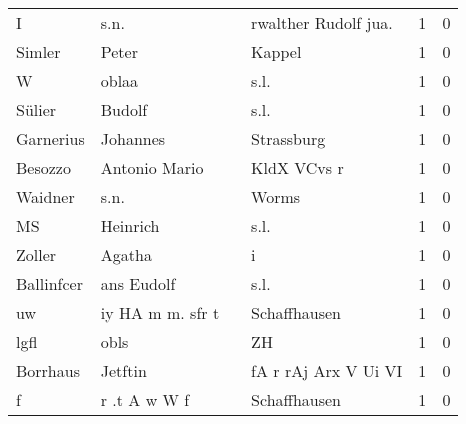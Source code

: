 \begin{center}
\begin{tiny}
\begin{longtabu}{llllrr}
                        I &                               s.n. &             &                       rwalther Rudolf jua.  &          1 &         0 \\
                   Simler &                              Peter &             &                                      Kappel &          1 &         0 \\
                        W &                              oblaa &             &                                        s.l. &          1 &         0 \\
                   Sülier &                             Budolf &             &                                        s.l. &          1 &         0 \\
                Garnerius &                           Johannes &             &                                  Strassburg &          1 &         0 \\
                  Besozzo &                      Antonio Mario &             &                                 KldX VCvs r &          1 &         0 \\
                  Waidner &                               s.n. &             &                                       Worms &          1 &         0 \\
                       MS &                           Heinrich &             &                                        s.l. &          1 &         0 \\
                   Zoller &                             Agatha &             &                                           i &          1 &         0 \\
               Ballinfcer &                         ans Eudolf &             &                                        s.l. &          1 &         0 \\
                       uw &                   iy HA m m. sfr t &             &                                Schaffhausen &          1 &         0 \\
                     lgfl &                               obls &             &                                          ZH &          1 &         0 \\
                 Borrhaus &                            Jetftin &             &                        fA r rAj Arx V Ui VI &          1 &         0 \\
                        f &                       r .t A w W f &             &                                Schaffhausen &          1 &         0 \\

\end{longtabu}
\end{tiny}
\end{center}
